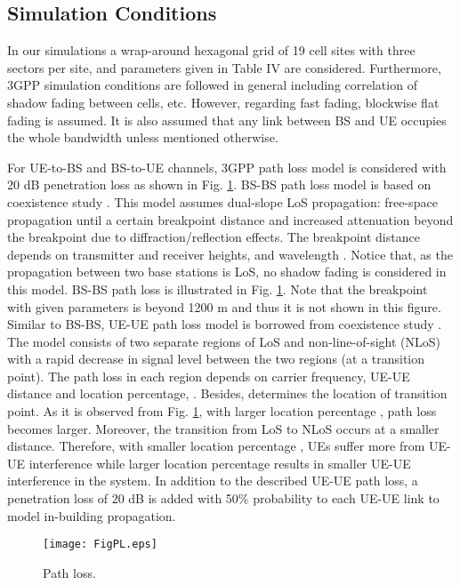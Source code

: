 \documentclass[twocolumn]{IEEEtran}
\begin{document}
\subsection{Simulation Conditions}

In our simulations a wrap-around hexagonal grid of 19 cell sites
with three sectors per site, and parameters given in Table IV are
considered. Furthermore, 3GPP simulation conditions \cite{3gpp} are
followed in general including correlation of shadow fading between
cells, etc. However, regarding fast fading, blockwise flat fading is
assumed. It is also assumed that any link between BS and UE occupies
the whole bandwidth unless mentioned otherwise.

For UE-to-BS and BS-to-UE channels, 3GPP path loss model \cite{3gpp}
is considered with 20 dB penetration loss as shown in Fig. \ref{pl}.
BS-BS path loss model is based on coexistence study \cite{coex}.
This model assumes dual-slope LoS propagation: free-space
propagation until a certain breakpoint distance and increased
attenuation beyond the breakpoint due to diffraction/reflection
effects. The breakpoint distance depends on transmitter and receiver
heights, and wavelength . Notice that, as the propagation
between two base stations is LoS, no shadow fading is considered in
this model. BS-BS path loss is illustrated in Fig. \ref{pl}. Note
that the breakpoint with given parameters is beyond 1200 m and thus
it is not shown in this figure. Similar to BS-BS, UE-UE path loss
model is borrowed from coexistence study \cite{coex}. The model
consists of two separate regions of LoS and non-line-of-sight (NLoS)
with a rapid decrease in signal level between the two regions (at a
transition point). The path loss in each region depends on carrier
frequency, UE-UE distance and location percentage, . Besides, 
determines the location of transition point. As it is observed from
Fig. \ref{pl}, with larger location percentage , path loss
becomes larger. Moreover, the transition from LoS to NLoS occurs at
a smaller distance. Therefore, with smaller location percentage ,
UEs suffer more from UE-UE interference while larger location
percentage  results in smaller UE-UE interference in the system.
In addition to the described UE-UE path loss, a penetration loss of
20 dB is added with 50\% probability to each UE-UE link to model
in-building propagation.


\begin{figure}[!t]

\centering
    {\texttt{[image: FigPL.eps]}}


\caption{Path loss. \label{pl} }

\end{figure}
\end{document}
